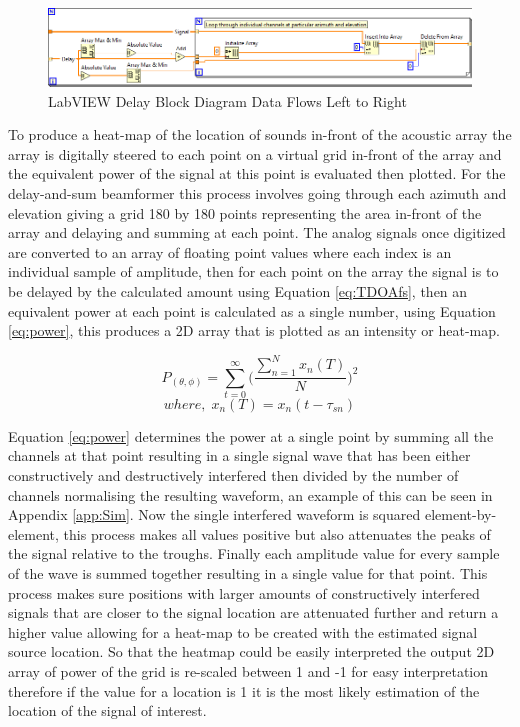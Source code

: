 \documentclass{UoNMCHA}
\numberwithin{equation}{section}
\begin{document}
    \begin{figure} [H]
        \centering
        \includegraphics[keepaspectratio, width = \textwidth]{Figures/DelayBlockDiagram.png}
        \caption{LabVIEW Delay Block Diagram Data Flows Left to Right}
        \label{fig:DelayLabVIEW}
    \end{figure}
    
    To produce a heat-map of the location of sounds in-front of the acoustic array the array is digitally steered to each point on a virtual grid in-front of the array and the equivalent power of the signal at this point is evaluated then plotted. For the delay-and-sum beamformer this process involves going through each azimuth and elevation giving a grid 180 by 180 points representing the area in-front of the array and delaying and summing at each point. The analog signals once digitized are converted to an array of floating point values where each index is an individual sample of amplitude, then for each point on the array the signal is to be delayed by the calculated amount using Equation \ref{eq:TDOAfs}, then an equivalent power at each point is calculated as a single number, using Equation \ref{eq:power}, this produces a 2D array that is plotted as an intensity or heat-map.
   
    \begin{equation}
        P_{(\theta, \phi)} = \sum_{t=0}^\infty\Big(\frac{\sum_{n=1}^N x_n(T)}{N}\Big)^2
        \label{eq:power}
    \end{equation}
    \begin{equation*}
        where,\;x_n(T) = x_n(t-\tau_{sn})
    \end{equation*}
    
    Equation \ref{eq:power} determines the power at a single point by summing all the channels at that point resulting in a single signal wave that has been either constructively and destructively interfered then divided by the number of channels normalising the resulting waveform, an example of this can be seen in Appendix \ref{app:Sim}. Now the single interfered waveform is squared element-by-element, this process makes all values positive but also attenuates the peaks of the signal relative to the troughs. Finally each amplitude value for every sample of the wave is summed together resulting in a single value for that point. This process makes sure positions with larger amounts of constructively interfered signals that are closer to the signal location are attenuated further and return a higher value allowing for a heat-map to be created with the estimated signal source location. So that the heatmap could be easily interpreted the output 2D array of power of the grid is re-scaled between 1 and -1 for easy interpretation therefore if the value for a location is 1 it is the most likely estimation of the location of the signal of interest.
    
\end{document}
